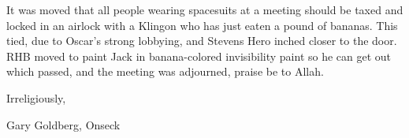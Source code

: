 \documentclass[12pt]{article}
\begin{document}
It was moved that all people wearing spacesuits at a meeting should be taxed and locked in an airlock with a Klingon who has just eaten a pound of bananas. This tied, due to Oscar's strong lobbying, and Stevens Hero inched closer to the door. RHB moved to paint Jack in banana-colored invisibility paint so he can get out which passed, and the meeting was adjourned, praise be to Allah.

\vspace{12pt}

\centerline{Irreligiously,}
\centerline{Gary Goldberg, Onseck}
\end{document}
